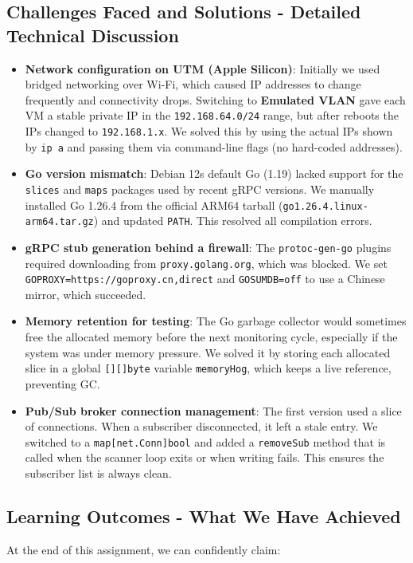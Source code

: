 \documentclass[a4paper]{article}
\begin{document}
\subsection{Challenges Faced and Solutions - Detailed Technical Discussion}
\begin{itemize}
    \item \textbf{Network configuration on UTM (Apple Silicon)}: Initially we used bridged networking over Wi-Fi, which caused IP addresses to change frequently and connectivity drops. Switching to \textbf{Emulated VLAN} gave each VM a stable private IP in the \texttt{192.168.64.0/24} range, but after reboots the IPs changed to \texttt{192.168.1.x}. We solved this by using the actual IPs shown by \texttt{ip a} and passing them via command-line flags (no hard-coded addresses).
    \item \textbf{Go version mismatch}: Debian 12s default Go (1.19) lacked support for the \texttt{slices} and \texttt{maps} packages used by recent gRPC versions. We manually installed Go 1.26.4 from the official ARM64 tarball (\texttt{go1.26.4.linux-arm64.tar.gz}) and updated \texttt{PATH}. This resolved all compilation errors.
    \item \textbf{gRPC stub generation behind a firewall}: The \texttt{protoc-gen-go} plugins required downloading from \texttt{proxy.golang.org}, which was blocked. We set \texttt{GOPROXY=https://goproxy.cn,direct} and \texttt{GOSUMDB=off} to use a Chinese mirror, which succeeded.
    \item \textbf{Memory retention for testing}: The Go garbage collector would sometimes free the allocated memory before the next monitoring cycle, especially if the system was under memory pressure. We solved it by storing each allocated slice in a global \texttt{[][]byte} variable \texttt{memoryHog}, which keeps a live reference, preventing GC.
    \item \textbf{Pub/Sub broker connection management}: The first version used a slice of connections. When a subscriber disconnected, it left a stale entry. We switched to a \texttt{map[net.Conn]bool} and added a \texttt{removeSub} method that is called when the scanner loop exits or when writing fails. This ensures the subscriber list is always clean.
\end{itemize}

\subsection{Learning Outcomes - What We Have Achieved}
At the end of this assignment, we can confidently claim:
\end{document}
